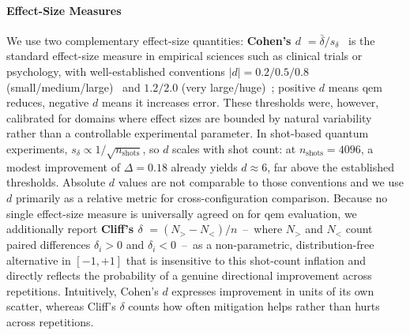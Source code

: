 \documentclass[10pt,conference]{IEEEtran}
\begin{document}
\paragraph{Effect-Size Measures}
We use two complementary effect-size quantities: \textbf{Cohen's $d$} $= \bar{\delta} / s_\delta$~\cite{cohen_statistical_1988} is the standard effect-size measure in empirical sciences such as clinical trials or psychology, with well-established conventions $|d| = 0.2/0.5/0.8$ (small/medium/large)~\cite{cohen_statistical_1988} and $1.2/2.0$ (very large/huge)~\cite{sawilowsky_new_2009}; positive $d$ means \gls{qem} reduces, negative $d$ means it increases error. These thresholds were, however, calibrated for domains where effect sizes are bounded by natural variability rather than a controllable experimental parameter. In shot-based quantum experiments, $s_\delta \propto 1/\sqrt{n_\text{shots}}$, so $d$ scales with shot count: at $n_\text{shots} = 4096$, a modest improvement of $\Delta = 0.18$ already yields $d \approx 6$, far above the established thresholds. Absolute $d$ values are not comparable to those conventions and we use $d$ primarily as a relative metric for cross-configuration comparison. Because no single effect-size measure is universally agreed on for \gls{qem} evaluation, we additionally report \textbf{Cliff's $\delta$} $= (N_{>} - N_{<}) / n$~--~where $N_{>}$ and $N_{<}$ count paired differences $\delta_i > 0$ and $\delta_i < 0$~--~as a non-parametric, distribution-free alternative in $[-1, +1]$ that is insensitive to this shot-count inflation and directly reflects the probability of a genuine directional improvement across repetitions. Intuitively, Cohen's $d$ expresses improvement in units of its own scatter, whereas Cliff's $\delta$ counts how often mitigation helps rather than hurts across repetitions.
\end{document}

